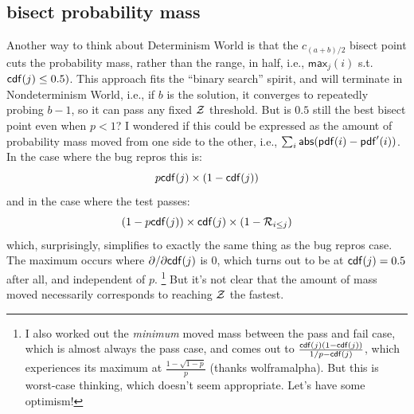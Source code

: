 \documentclass[11pt]{sigplanconf}
\begin{document}
\subsection{bisect probability mass}

Another way to think about Determinism World is that the $c_{(a+b)/2}$ bisect point
cuts the probability mass, rather than the range, in half,
i.e., $\mathsf{max}_j (i)$ s.t. $\mathsf{cdf}(j) \le 0.5)$.
This approach
fits the ``binary search'' spirit,
and will terminate in Nondeterminism World,
i.e.,
if $b$ is the solution, it converges to repeatedly probing $b-1$,
so it can pass any fixed $\mathcal{Z}$ threshold.
%
But is $0.5$ still the best bisect point even when $p<1$?
I wondered if this could be expressed as the amount of probability mass moved from one side to the other,
i.e., $\sum_i \mathsf{abs}(\mathsf{pdf}(i) - \mathsf{pdf}'(i))$.
In the case where the bug repros this is:
\[
	p\mathsf{cdf}(j) \times (1-\mathsf{cdf}(j))
\]
and in the case where the test passes:
\[
	(1-p\mathsf{cdf}(j)) \times \mathsf{cdf}(j) \times (1-\mathcal{R}_{i\le j})
\]
which, surprisingly, simplifies to exactly the same thing as the bug repros case.
The maximum occurs where $\partial/\partial \mathsf{cdf}(j)$ is 0,
which turns out to be at $\mathsf{cdf}(j)=0.5$ after all, and independent of $p$.%
\footnote{I also worked out the {\it minimum} moved mass between the pass and fail case,
which is almost always the pass case,
and comes out to
$\frac{\mathsf{cdf}(j)(1-\mathsf{cdf}(j))}{1/p-\mathsf{cdf}(j)}$,
which experiences its maximum at
$\frac{1-\sqrt{1-p}}{p}$ (thanks wolframalpha).
But this is worst-case thinking, which doesn't seem appropriate.
Let's have some optimism!}
But it's not clear that the amount of mass moved
necessarily corresponds to reaching $\mathcal{Z}$ the fastest.
\end{document}
